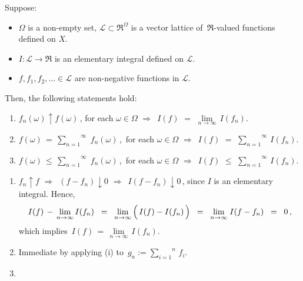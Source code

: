 \begin{lemma}
\mbox{}\vskip 0.1cm
\noindent
Suppose:
\begin{itemize}
\item
	$\Omega$ is a non-empty set,
	$\mathcal{L} \subset \Re^{\Omega}$ is a vector lattice of \,$\Re$-valued functions defined on $X$.
\item
	$I : \mathcal{L} \longrightarrow \Re$ is an elementary integral defined on $\mathcal{L}$.
\item
	$f, f_{1}, f_{2}, \ldots \in \mathcal{L}$ are non-negative functions in $\mathcal{L}$.
\end{itemize}
Then, the following statements hold:
\begin{enumerate}
\item
	$f_{n}(\omega) \uparrow f(\omega)$\,, for each $\omega\in\Omega$
	\;\;$\Longrightarrow$\;\,
	$I(f)$ $=$ $\underset{n\rightarrow\infty}{\lim}\,I(f_{n})$.
\item
	$f(\omega) \,=\, \overset{\infty}{\underset{n=1}{\sum}}\;f_{n}(\omega)$\,,\,
	for each $\omega\in\Omega$
	\;\;$\Longrightarrow$\;\,
	$I(f)$ $=$ $\overset{\infty}{\underset{n=1}{\sum}}\,I(f_{n})$.
\item
	$f(\omega) \,\leq\, \overset{\infty}{\underset{n=1}{\sum}}\;f_{n}(\omega)$\,,\,
	for each $\omega\in\Omega$
	\;\;$\Longrightarrow$\;\,
	$I(f)$ $\leq$ $\overset{\infty}{\underset{n=1}{\sum}}\,I(f_{n})$.
\end{enumerate}
\end{lemma}
\proof
\begin{enumerate}
\item
	$f_{n} \uparrow f$
	\;\;$\Longrightarrow$\,\; $(f - f_{n}) \downarrow 0$
	\;\;$\Longrightarrow$\,\; $I(f - f_{n}) \downarrow 0$\,,
	since $I$ is an elementary integral.
	Hence,
	\begin{equation*}
	I(f) \,- \,\underset{n\rightarrow\infty}{\lim}\,I(f_{n})
	\;\; = \;\;
		\underset{n\rightarrow\infty}{\lim} \left(\, I(f) \overset{{\color{white}.}}{-} I(f_{n}) \,\right)
	\;\; = \;\;
		\underset{n\rightarrow\infty}{\lim}\;I(f \overset{{\color{white}.}}{-} f_{n})
	\;\; = \;\;
		0\,,
	\end{equation*}
	which implies \,$I(f) \,=\,\underset{n\rightarrow\infty}{\lim}\,I(f_{n})$.
\item
	Immediate by applying (i) to \,$g_{n} := \overset{n}{\underset{i=1}{\sum}}\,f_{i}$.
\item
\end{enumerate}

